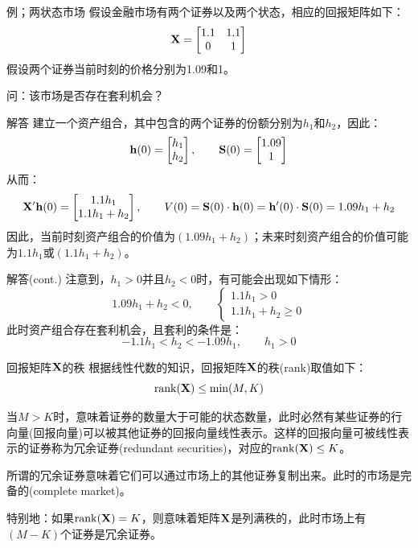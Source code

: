 \documentclass[t]{beamer}
\begin{document}
\begin{frame}{例；两状态市场}
	假设金融市场有两个证券以及两个状态，相应的回报矩阵如下：
\[{\bf X}=\begin{bmatrix}
1.1&1.1\\
0&1
\end{bmatrix} \]
假设两个证券当前时刻的价格分别为1.09和1。

问：该市场是否存在套利机会？
\end{frame}

\begin{frame}{解答}
	建立一个资产组合，其中包含的两个证券的份额分别为$h_1$和$h_2$，因此：
\[{\bf h}(0)=\begin{bmatrix}
h_1\\h_2
\end{bmatrix},\qquad {\bf S}(0)=\begin{bmatrix}
1.09\\1
\end{bmatrix}  \]
从而：
\[{\bf X}'{\bf h}(0)=\begin{bmatrix}
1.1h_1\\ 1.1h_1+h_2
\end{bmatrix},\qquad V(0)={\bf S}(0)\cdot {\bf h}(0)={\bf h}'(0)\cdot {\bf S}(0)=1.09h_1+h_2  \]
因此，当前时刻资产组合的价值为$(1.09h_1+h_2)$；未来时刻资产组合的价值可能为$1.1h_1$或$(1.1h_1+h_2)$。
\end{frame}



\begin{frame}{解答(cont.)}
	注意到，$h_1>0$并且$h_2<0$时，有可能会出现如下情形：
\[1.09h_1+h_2<0,\qquad \begin{cases}
1.1h_1> 0\\
1.1h_1+h_2\ge 0
\end{cases}\]
此时资产组合存在套利机会，且套利的条件是：$$-1.1h_1<h_2<-1.09h_1,\qquad  h_1>0$$
\end{frame}






\begin{frame}{回报矩阵${\bf X}$的秩}
根据线性代数的知识，回报矩阵${\bf X}$的秩(rank)取值如下：
\[{\rm rank}({\bf X})\le \min(M,K) \]

当$M>K$时，意味着证券的数量大于可能的状态数量，此时必然有某些证券的行向量(回报向量)可以被其他证券的回报向量线性表示。这样的回报向量可被线性表示的证券称为冗余证券(redundant securities)，对应的${\rm rank}({\bf X})\le K$。

所谓的冗余证券意味着它们可以通过市场上的其他证券复制出来。此时的市场是完备的(complete market)。

特别地：如果${\rm rank}({\bf X})= K$，则意味着矩阵$\bf X$是列满秩的，此时市场上有$(M-K)$个证券是冗余证券。
\end{frame}
\end{document}
